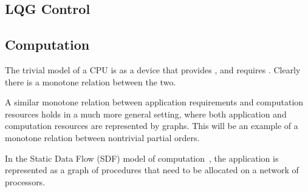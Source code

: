 \begin{figure}[h]
  \caption{}
\end{figure}


\subsection{LQG Control}


\subsection{Computation}


The trivial model of a CPU is as a device that provides , and requires . Clearly there
is a monotone relation between the two.

\begin{figure}[h]
  \begin{center}
  \end{center}
  \caption{}
\end{figure}

A similar monotone relation between application requirements and computation
resources holds in a much more general setting, where both application
and computation resources are represented by graphs. This will be
an example of a monotone relation between nontrivial partial orders.

In the Static Data Flow (SDF) model of computation~\cite[Chapter 3]{sriram00,lee10},
the application is represented as a graph of procedures that need
to be allocated on a network of processors.

\begin{figure}[h]
  \begin{center}
  \end{center}
  \caption{}
\end{figure}


